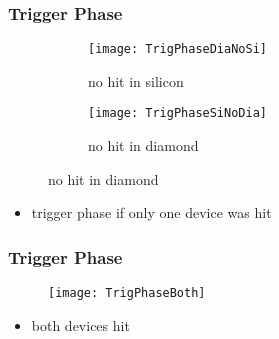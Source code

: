 \begin{frame}
	\frametitle{Trigger Phase}
	\begin{figure} 
		\begin{center}
			\begin{subfigure}{0.45\textwidth}  
				\centering 
				\texttt{[image: TrigPhaseDiaNoSi]}
				\caption{no hit in silicon}
			\end{subfigure}
			\begin{subfigure}{0.45\textwidth} 
				\centering 
				\texttt{[image: TrigPhaseSiNoDia]}
				\caption{no hit in diamond}
			\end{subfigure} 
		\end{center}
	\end{figure}
	\begin{itemize}
		\item trigger phase if only one device was hit
	\end{itemize}
\end{frame}
\begin{frame}
	\frametitle{Trigger Phase}
	\begin{figure} 
		\centering 
		\texttt{[image: TrigPhaseBoth]}
	\end{figure}
	\begin{itemize}
		\item both devices hit
	\end{itemize}
\end{frame}